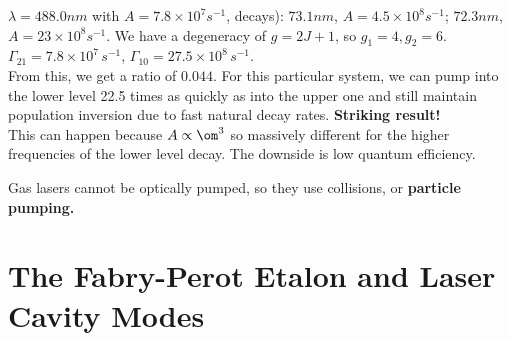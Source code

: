 \documentclass[a4paper, 11pt, normalem]{report}
\begin{document}
\begin{example}
    \begin{wrapfigure}{l}{0.25\textwidth}
        \centering
    \end{wrapfigure}
    $\lambda=488.0nm$ with $A = 7.8\times10^7 s^{-1}$, decays): $73.1nm$, $A = 4.5\times10^8 s^{-1}$; $72.3nm$, $A = 23\times10^8 s^{-1}$.
    We have a degeneracy of $g = 2J+1$, so $g_1 = 4, g_2 = 6$.
    $\Gamma_{21} = 7.8\times10^7\,s^{-1}$, $\Gamma_{10}=27.5\times10^8\,s^{-1}$.\\
    From this, we get a ratio of $0.044$.
    For this particular system, we can pump into the lower level 22.5 times as quickly as into the upper one and still maintain population inversion due to fast natural decay rates.
    \textbf{Striking result!}\\
    This can happen because $A \propto \om^3$ so massively different for the higher frequencies of the lower level decay.
    The downside is low quantum efficiency.
\end{example}
Gas lasers cannot be optically pumped, so they use collisions, or \textbf{particle pumping.}

\chapter{The Fabry-Perot Etalon and Laser Cavity Modes}
\end{document}
